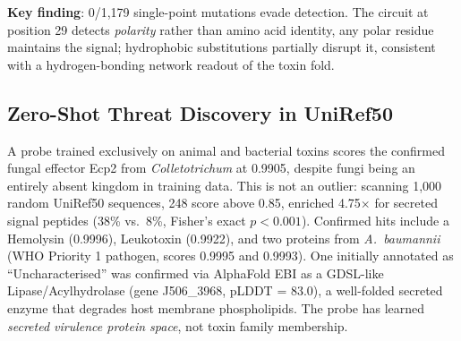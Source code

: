 \documentclass[11pt,a4paper]{article}
\begin{document}
\textbf{Key finding}: 0/1,179 single-point mutations evade detection. The circuit at position 29 detects \textit{polarity} rather than amino acid identity, any polar residue maintains the signal; hydrophobic substitutions partially disrupt it, consistent with a hydrogen-bonding network readout of the toxin fold.

\subsection{Zero-Shot Threat Discovery in UniRef50}

A probe trained exclusively on animal and bacterial toxins scores the confirmed fungal
effector Ecp2 from \textit{Colletotrichum} at 0.9905, despite fungi being an entirely
absent kingdom in training data. This is not an outlier: scanning 1,000 random UniRef50
sequences, 248 score above 0.85, enriched 4.75$\times$ for secreted signal peptides
(38\% vs.\ 8\%, Fisher's exact $p < 0.001$). Confirmed hits include a Hemolysin (0.9996),
Leukotoxin (0.9922), and two proteins from \textit{A.\ baumannii} (WHO Priority 1
pathogen, scores 0.9995 and 0.9993). One initially annotated as ``Uncharacterised'' was
confirmed via AlphaFold EBI as a GDSL-like Lipase/Acylhydrolase (gene J506\_3968,
pLDDT = 83.0), a well-folded secreted enzyme that degrades host membrane phospholipids.
The probe has learned \textit{secreted virulence protein space}, not toxin family membership.
\end{document}
